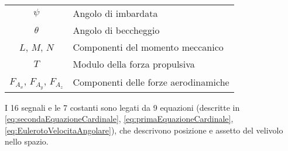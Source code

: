 \begin{table}[H]
\begin{tabularx}{\textwidth}{|c|X|}
        $\psi$                                 & Angolo di imbardata                                                                                                               \\
        $\theta$                               & Angolo di beccheggio                                                                                                              \\
        $L$, $M$, $N$                          & Componenti del momento meccanico                                                                                                  \\
        $T$                                    & Modulo della forza propulsiva                                                                                                     \\
        $F_{A_x}$, $F_{A_y}$, $F_{A_z}$        & Componenti delle forze aerodinamiche                                                                                              \\
        \hline
    \end{tabularx}
\end{table}

I 16 segnali e le 7 costanti sono legati da 9 equazioni (descritte in \eqref{eq:secondaEquazioneCardinale}, \eqref{eq:primaEquazioneCardinale}, \eqref{eq:EulerotoVelocitaAngolare}), che descrivono posizione e assetto del velivolo nello spazio.